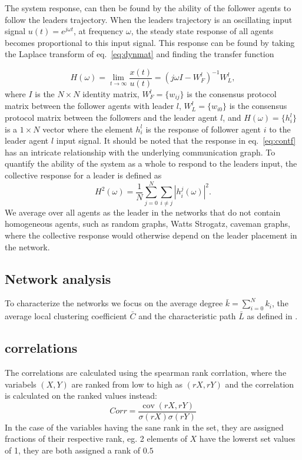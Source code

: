 \documentclass[fleqn,10pt]{wlscirep}
\begin{document}
The system response, can then be found by the ability of the follower agents to follow the leaders trajectory. When the leaders trajectory is an oscillating input signal $u(t)=e^{j\omega t}$, at frequency $\omega$, the steady state response of all agents becomes proportional to this input signal. This response can be found by taking the Laplace transform of eq.~\ref{eq:dynmat} and finding the transfer function

\begin{equation}
  \label{eq:contf}
  H(\omega) = \lim_{t \to \infty}\frac{x(t)}{u(t)} = \left(j\omega I - W^{l}_F\right)^{-1}W^{l}_L,
\end{equation}
where $I$ is the $N\times N$ identity matrix, $W^{l}_F = \{w_{ij}\}$ is the consensus protocol matrix between the follower agents with leader $l$, $W^{l}_L = \{w_{i0}\}$ is the consensus protocol matrix between the followers and the leader agent $l$, and $H(\omega)=\{h^{l}_i\}$ is a $1 \times N$ vector where the element $h^{l}_{i}$ is the response of follower agent $i$ to the leader agent $l$ input signal. It should be noted that the response in eq.~\ref{eq:contf} has an intricate relationship with the underlying communication graph. To quantify the ability of the system as a whole to respond to the leaders input, the collective response for a leader is defined as
\begin{equation}
H^{2}(\omega) = \frac{1}{N}\sum_{j=0}^{N}\sum_{i\neq j}|h_i^j(\omega)|^2.
\label{eq:colgain}
\end{equation}
We average over all agents as the leader in the networks that do not contain homogeneous agents, such as random graphs, Watts Strogatz, caveman graphs, where the collective response would otherwise depend on the leader placement in the network.

\subsection*{Network analysis}
\label{sec:na}

To characterize the networks we focus on the average degree $\bar{k} =  \sum_{i=0}^{N}k_i$, the average local clustering coefficient $\bar{C}$ and the characteristic path $\bar{L}$ as defined in \cite{watts1998collective}.

\subsection*{correlations}      

The correlations are calculated using the spearman rank corrlation, where the variabels $(X,Y)$ are ranked from low to high as $(rX,rY)$ and the correlation is calculated on the ranked values instead:
\begin{equation}
Corr = \frac{\operatorname{cov}(rX,rY)}{\sigma(rX)\sigma(rY)}
\end{equation}
In the case of the variables having the sane rank in the set, they are assigned fractions of their respective rank, eg. 2 elements of $X$ have the lowerst set values of 1, they are both assigned a rank of $0.5$
\end{document}
